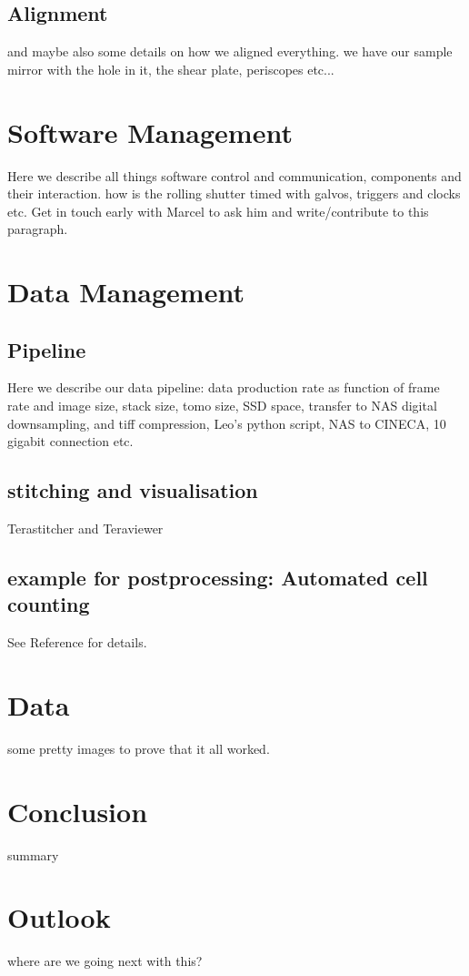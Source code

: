 \documentclass[12pt]{spieman}  %
\begin{document}
\begin{spacing}{2}
	\subsection{Alignment}
and maybe also some details on how we aligned everything. we have our sample mirror with the hole in it, the shear plate, periscopes etc...

	
\section{Software Management}
Here we describe all things software control and communication, components and their interaction. how is the rolling shutter timed with galvos, triggers and clocks etc. Get in touch early with Marcel to ask him and write/contribute to this paragraph.

\section{Data Management}
	\subsection{Pipeline}
	Here we describe our data pipeline: data production rate as function of frame rate and image size, stack size, tomo size, SSD space, transfer to NAS digital downsampling, and tiff compression, Leo's python script, NAS to CINECA, 10 gigabit connection etc.

	\subsection{stitching and visualisation}
	Terastitcher and Teraviewer

	\subsection{example for postprocessing: Automated cell counting}
	See Reference\cite{Frasconi2014} for details.


\section{Data}
some pretty images to prove that it all worked.

\section{Conclusion}
summary

\section{Outlook}
where are we going next with this? 


\end{spacing}
\end{document}
